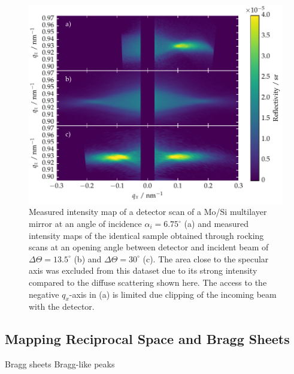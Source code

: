 \begin{figure}[htbp]
        \includegraphics[width=
        \textwidth]{img/PTB17_diffuse_scattering_multiple_geometries} \caption{Measured intensity map of a detector scan of a Mo/Si multilayer mirror at an angle of incidence $\alpha_i = 6.75^\circ$ (a) and  measured intensity maps of the identical sample obtained through rocking scans at an opening angle between detector and incident beam of $\Delta \Theta = 13.5^\circ$ (b) and $\Delta \Theta = 30^\circ$ (c). The area close to the specular axis was excluded from this dataset due to its strong intensity compared to the diffuse scattering shown here. The access to the negative $q_x$-axis in (a) is limited due clipping of the incoming beam with the detector.} \label{fig:comparison} 
\end{figure}

\subsection{Mapping Reciprocal Space and Bragg Sheets}
Bragg sheets \cite{jiang_nonspecular_1992, holy_nonspecular_1994, salditt_kinetic_1994}
Bragg-like peaks \cite{holy_nonspecular_1994}


